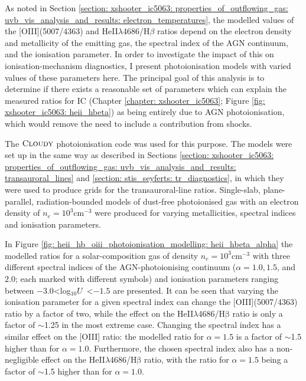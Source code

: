 As noted in Section \ref{section: xshooter_ic5063: properties_of_outflowing_gas: uvb_vis_analysis_and_results: electron_temperatures}, the modelled values of the [OIII](5007/4363) and HeII$\lambda$4686/H$\beta$ ratios depend on the electron density and metallicity of the emitting gas, the spectral index of the AGN continuum, and the ionisation parameter. In order to investigate the impact of this on ionisation-mechanism diagnostics, I present photoionisation models with varied values of these parameters here. The principal goal of this analysis is to determine if there exists a reasonable set of parameters which can explain the measured ratios for IC (Chapter \ref{chapter: xshooter_ic5063}; Figure \ref{fig: xshooter_ic5063: heii_hbeta}) as being entirely due to AGN photoionisation, which would remove the need to include a contribution from shocks.

The $\textsc{Cloudy}$ photoionisation code was used for this purpose. The models were set up in the same way as described in Sections \ref{section: xshooter_ic5063: properties_of_outflowing_gas: uvb_vis_analysis_and_results: transauroral_lines} and  \ref{section: stis_seyferts: tr_diagnostics}, in which they were used to produce grids for the transauroral-line ratios. Single-slab, plane-parallel, radiation-bounded models of dust-free photoionised gas with an electron density of $n_e=10^3$\;cm$^{-3}$ were produced for varying metallicities, spectral indices and ionisation parameters.

In Figure \ref{fig: heii_hb_oiii_photoionisation_modelling: heii_hbeta_alpha} the modelled ratios for a solar-composition gas of density $n_e=10^3$\;cm$^{-3}$ with three different spectral indices of the AGN-photoionising continuum ($\alpha = 1.0, 1.5$, and $2.0$; each marked with different symbols) and ionisation parameters ranging between \mbox{$-3.0$\;\textless\;log$_{10}U$ \textless\;$-1.5$} are presented. It can be seen that varying the ionisation parameter for a given spectral index can change the [OIII](5007/4363) ratio by a factor of two, while the effect on the HeII$\lambda$4686/H$\mathrm{\beta}$ ratio is only a factor of $\sim$1.25 in the most extreme case. Changing the spectral index has a similar effect on the [OIII] ratio: the modelled ratio for $\alpha=1.5$ is a factor of $\sim$1.5 higher than for $\alpha=1.0$. Furthermore, the chosen spectral index also has a non-negligible effect on the HeII$\lambda$4686/H$\mathrm{\beta}$ ratio, with the ratio for $\alpha=1.5$ being a factor of $\sim$1.5 higher than for $\alpha=1.0$.

